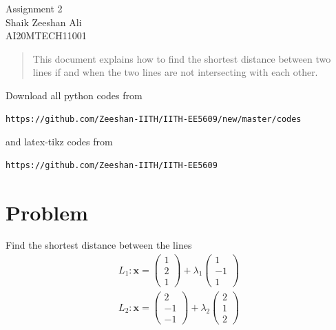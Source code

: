 \documentclass[journal,12pt,twocolumn]{IEEEtran}
\begin{document}
\begin{center}
\huge Assignment 2\\

\large Shaik Zeeshan Ali\\
\large AI20MTECH11001\\
\end{center}
\vspace{0.5cm}
\begin{abstract}
This document explains how to find the shortest distance between two lines if and when the two lines are not intersecting with each other.
\end{abstract}
\vspace{0.5cm}
Download all python codes from 
\begin{lstlisting}
https://github.com/Zeeshan-IITH/IITH-EE5609/new/master/codes
\end{lstlisting}
%
and latex-tikz codes from 
\begin{lstlisting}
https://github.com/Zeeshan-IITH/IITH-EE5609
\end{lstlisting}
%
\vspace{0.5cm}
\section{Problem}
Find the shortest distance between the lines \\
\begin{align}
    L_1\colon \bm{x}= \begin{pmatrix}1\\2\\1\end{pmatrix}+\lambda_1\begin{pmatrix}1\\-1\\1\end{pmatrix}\\
    L_2\colon \bm{x}= \begin{pmatrix}2\\-1\\-1\end{pmatrix}+\lambda_2\begin{pmatrix}2\\1\\2\end{pmatrix}
\end{align}
\end{document}
